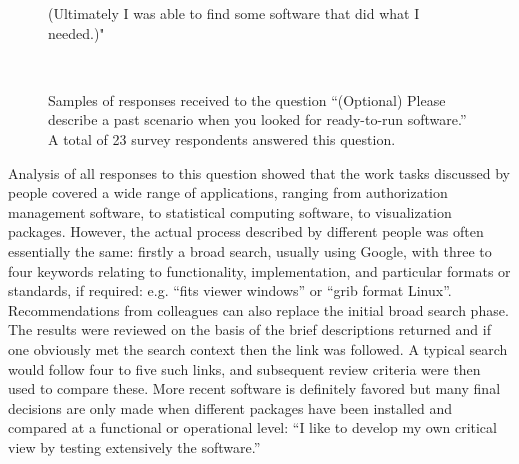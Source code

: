 \documentclass{casicswhitepaper}
\begin{document}
\begin{figure}[t]
{\begin{minipage}{5.75in}
(Ultimately I was able to find some software that did what I needed.)"  \end{minipage}}\\
  \vspace*{1.5ex}
  \caption{Samples of responses received to the question ``(Optional) Please describe a past scenario when you looked for ready-to-run software.''  A total of 23 survey respondents answered this question.}
  \label{sample-responses}
\end{figure}  

Analysis of all responses to this question showed that the work tasks discussed by people covered a wide range of applications, ranging from authorization management software, to statistical computing software, to visualization packages. However, the actual process described by different people was often essentially the same: firstly a broad search, usually using Google, with three to four keywords relating to functionality, implementation, and particular formats or standards, if required: e.g. ``fits viewer windows'' or ``grib format Linux''. Recommendations from colleagues can also replace the initial broad search phase. The results were reviewed on the basis of the brief descriptions returned and if one obviously met the search context then the link was followed. A typical search would follow four to five such links, and subsequent review criteria were then used to compare these. More recent software is definitely favored but many final decisions are only made when different packages have been installed and compared at a functional or operational level: ``I like to develop my own critical view by testing extensively the software.''
\end{document}
